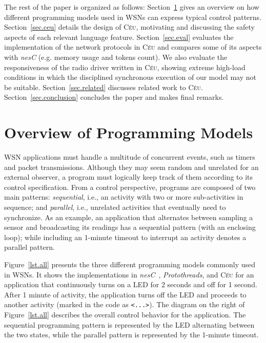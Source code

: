\documentclass[letterpaper]{sig-alternate}
\newcommand{\code}[1] {{\small{\texttt{#1}}}}
\newcommand{\CEU}{\textsc{C\'{e}u}\xspace}
\begin{document}
The rest of the paper is organized as follows:
Section~\ref{sec.overview} gives an overview on how different programming 
models used in WSNs can express typical control patterns.
Section~\ref{sec.ceu} details the design of \CEU, motivating and discussing the
safety aspects of each relevant language feature.
Section~\ref{sec.eval} evaluates the implementation of the network protocols in 
\CEU and compares some of its aspects with \emph{nesC} (e.g. memory usage and 
tokens count).
We also evaluate the responsiveness of the radio driver written in \CEU, 
showing extreme high-load conditions in which the disciplined synchronous 
execution of our model may not be suitable.
Section~\ref{sec.related} discusses related work to \CEU.
Section~\ref{sec.conclusion} concludes the paper and makes final remarks.

\section{Overview of Programming Models}
\label{sec.overview}

WSN applications must handle a multitude of concurrent events, such as timers 
and packet transmissions.
Although they may seem random and unrelated for an external observer, a
program must logically keep track of them according to its control 
specification.
%
From a control perspective, programs are composed of two main patterns: 
\emph{sequential}, i.e., an activity with two or more sub-activities in 
sequence;
and \emph{parallel}, i.e., unrelated activities that eventually need to 
synchronize.
%
As an example, an application that alternates between sampling a sensor and 
broadcasting its readings has a sequential pattern (with an enclosing loop); 
while including an 1-minute timeout to interrupt an activity denotes a parallel 
pattern.

Figure~\ref{lst.all} presents the three different programming models commonly 
used in WSNs.
It shows the implementations in \emph{nesC}~\cite{wsn.nesc}, 
\emph{Protothreads}\cite{wsn.protothreads}, and \CEU for an application that 
continuously turns on a LED for 2 seconds and off for 1 second.
After 1 minute of activity, the application turns off the LED and proceeds to 
another activity (marked in the code as \code{<...>}).
The diagram on the right of Figure~\ref{lst.all} describes the overall control 
behavior for the application.
The sequential programming pattern is represented by the LED alternating between 
the two states, while the parallel pattern is represented by the 1-minute 
timeout.
\end{document}

